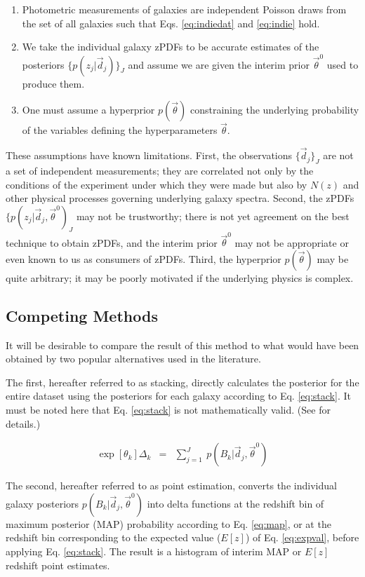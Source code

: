 \documentclass[preprint]{aastex}
\begin{document}
\begin{enumerate}
\item Photometric measurements of galaxies are independent Poisson draws from the set of all galaxies such that Eqs. \ref{eq:indiedat} and \ref{eq:indie} hold.
\item We take the individual galaxy zPDFs to be accurate estimates of the posteriors $\{p(z_{j}|\vec{d}_{j})\}_{J}$ and assume we are given the interim prior $\vec{\theta}^{0}$ used to produce them.
\item One must assume a hyperprior $p(\vec{\theta})$ constraining the underlying probability of the variables defining the hyperparameters $\vec{\theta}$.
\end{enumerate}

These assumptions have known limitations.  First, the observations $\{\vec{d}_{j}\}_{J}$ are not a set of independent measurements; they are correlated not only by the conditions of the experiment under which they were made but also by $N(z)$ and other physical processes governing underlying galaxy spectra.  Second, the zPDFs $\{p(z_{j}|\vec{d}_{j},\vec{\theta}^{0})_{J}$ may not be trustworthy; there is not yet agreement on the best technique to obtain zPDFs, and the interim prior $\vec{\theta}^{0}$ may not be appropriate or even known to us as consumers of zPDFs.  Third, the hyperprior $p(\vec{\theta})$ may be quite arbitrary; it may be poorly motivated if the underlying physics is complex.

\clearpage
\subsection{Competing Methods}
\label{sec:sheldon}

It will be desirable to compare the result of this method to what would have been obtained by two popular alternatives used in the literature.   

The first, hereafter referred to as stacking, directly calculates the posterior for the entire dataset using the posteriors for each galaxy according to Eq. \ref{eq:stack}.  \citep{lim08}  It must be noted here that Eq. \ref{eq:stack} is not mathematically valid.  (See \citet{hog12} for details.)  

\begin{eqnarray}
\label{eq:stack}
\exp[\theta_{k}]\Delta_{k} &=& \sum_{j=1}^{J}\ p(B_{k}|\vec{d}_{j},\vec{\theta}^{0})
\end{eqnarray}

The second, hereafter referred to as point estimation, converts the individual galaxy posteriors $p(B_{k}|\vec{d}_{j},\vec{\theta}^{0})$ into delta functions at the redshift bin of maximum posterior (MAP) probability according to Eq. \ref{eq:map}, or at the redshift bin corresponding to the expected value ($E[z]$) of Eq. \ref{eq:expval}, before applying Eq. \ref{eq:stack}.  The result is a histogram of interim MAP or $E[z]$ redshift point estimates.
\end{document}
